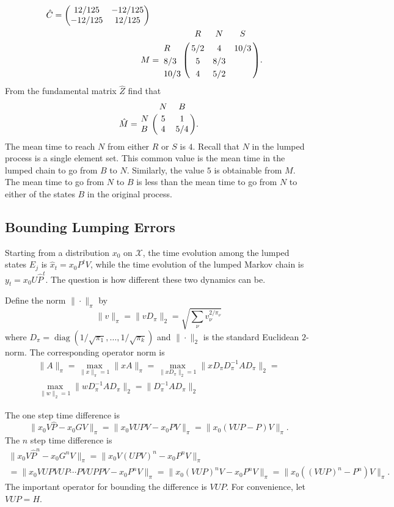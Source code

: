 \documentclass[12pt]{article}
\begin{document}
\begin{example}
\begin{align*}
    \hat{C} =
    \begin{pmatrix}
      12/125  & -12/125 \\
    -12/125   &  12/125
  \end{pmatrix} \\
    M &= \bordermatrix{
        & R & N & S \cr
    R & 5/2 & 4 & 10/3 \cr
    8/3 & 5 & 8/3 \cr
    10/3 & 4 & 5/2}.
  \end{align*}
  From the fundamental matrix \( \hat{Z} \) find that
  \[
    \hat{M} = \bordermatrix{
      & N & B \cr
      N & 5 & 1 \cr
      B & 4 & 5/4
    }.
  \]
The mean time to reach \( N \) from either \( R \) or \( S
\) is \( 4 \).  Recall that \( N \) in the lumped process is a single
element set.  This common value is the mean time in the lumped chain
to go from $B$ to $N$.  Similarly, the value \( 5 \) is obtainable
from \( M \).  The mean time to go from $N$ to $B$ is less than the
mean time to go from $N$ to either of the states $B$ in the original
process.
\end{example}

\subsection*{Bounding Lumping Errors}

Starting from a distribution $x_0$ on $\mathcal{X}$, the time
evolution among the lumped states $E_j$ is $\hat{x}_{t} = x_0 P^t V$,
while the time evolution of the lumped Markov chain is $y_t = x_0U
\hat{P}^t$.  The question is how different these two dynamics can be.

Define the norm $\| \cdot \|_{\pi}$ by
\[
  \| v\|_{\pi} = \| v D_{\pi} \|_2 = \sqrt{\sum_{\nu}
    v_{\nu}^{2/\pi_\nu}}
\]
where $D_{\pi} = \operatorname{diag}(1/\sqrt{\pi_1}, \dots,
1/\sqrt{\pi_k})$ and $\| \cdot \|_2$ is the standard Euclidean
$2$-norm.  The corresponding operator norm is
\begin{multline*}
  \| A \|_{\pi} = \max_{\|x\|_{\pi}=1}\|xA\|_{\pi} =
  \max_{\|xD_{\pi}\|_2 = 1}\|x D_{\pi} D_{\pi}^{-1} A D_{\pi}\|_{2} = \\
  \max_{\|w\|_2 = 1}\|w D_{\pi}^{-1} A D_{\pi}\|_{2} =
  \| D_{\pi}^{-1} A D_{\pi}\|_{2}
\end{multline*}

The one step time difference is
\[
  \| x_0 V \hat{P} - x_0 G V \|_{\pi} = \| x_0 V U P V - x_0 P V
  \|_{\pi} = \| x_0 (VUP - P) V \|_{\pi}.
\]
The $n$ step time difference is
\begin{multline*}
  \| x_0 V \hat{P}^n - x_0 G^n V \|_{\pi} = \| x_0 V (U P V)^n - x_0 P^n V
  \|_{\pi} \\
  = \| x_0 VUPVUP \cdots PVUPPV  - x_0 P^n V \|_{\pi} = \| x_0
  (VUP)^n V - x_0 P^n V \|_{\pi} = \| x_0 ((VUP)^n - P^n) V \|_{\pi}.
\end{multline*}
The important operator for bounding the difference is $VUP$.
For convenience, let $VUP = H$.
\end{document}
